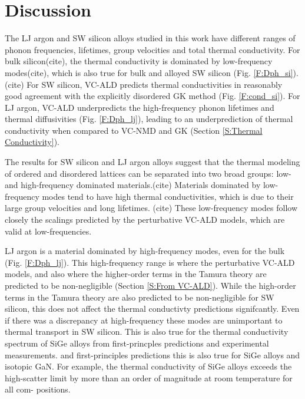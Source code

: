 \documentclass[aps,prb,onecolumn,preprint,superscriptaddress,amsmath,amssymb,floatfix]{revtex4}
\begin{document}
\section{\label{S:Discussion}Discussion}

The LJ argon and SW silicon alloys studied in this work 
have different ranges of phonon frequencies, 
lifetimes, group velocities and total thermal conductivity. 
For bulk silicon(cite), the thermal conductivity 
is dominated by low-frequency modes(cite), which is also true for 
bulk and alloyed SW silicon (Fig. \ref{F:Dph_si}).(cite) For SW silicon, 
VC-ALD predicts thermal conductivities in reasonably 
good agreement with the 
explicitly disordered GK method (Fig. \ref{F:cond_si}).  
For LJ argon, VC-ALD underpredicts 
the high-frequency phonon lifetimes and thermal diffusivities 
(Fig. \ref{F:Dph_lj}), 
leading to an underprediction of 
thermal conductivity when compared to VC-NMD and GK 
(Section \ref{S:Thermal Conductivity}). 

The results for SW silicon and LJ argon alloys suggest that 
the thermal modeling of ordered and 
disordered lattices can be separated into two broad groups: 
low- and high-frequency dominated materials.(cite) Materials dominated 
by low-frequency modes tend to have high thermal conductivities, 
which is due to their large group velocities and long lifetimes.
(cite) These low-frequency modes  
follow closely the scalings predicted by the perturbative VC-ALD 
models, which are valid at low-frequencies. 

LJ argon is a material 
dominated by high-frequency modes, even for the bulk 
(Fig. \ref{F:Dph_lj}). 
This high-frequency range is where the perturbative VC-ALD models, 
and also where the higher-order 
terms in the Tamura theory are predicted to be non-negligible 
(Section \ref{S:From VC-ALD}). 
While the 
high-order terms in the Tamura theory are also predicted to be 
non-negligible for SW silicon, this does not affect the thermal 
conductivty predictions signifcantly. Even if there was a discrepancy 
at high-frequency these modes 
are unimportant to thermal transport in SW silicon. This is also 
true for the thermal conductivity spectrum of SiGe alloys 
from first-princples predictions\cite{garg_role_2011} and experimental 
measurements.\cite{abeles_thermal_1962,cahill_thermal_2004,
cahill_thermal_2005,cheaito_experimental_2012} 
and first-principles predictions\cite{garg_role_2011,lindsay_thermal_2012} 
this is also true for SiGe alloys and isotopic GaN.
\cite{} 
For example, the thermal conductivity of SiGe alloys
exceeds the high-scatter limit by more than
an order of magnitude at room temperature for all com-
positions.
\end{document}

